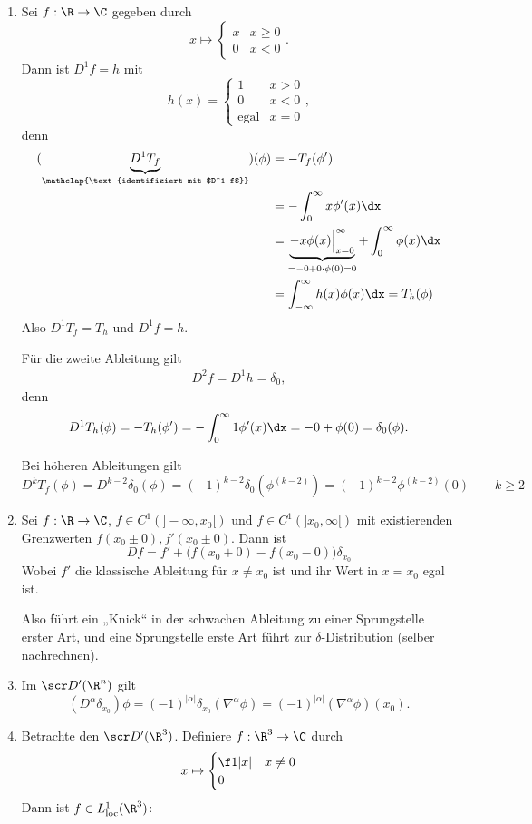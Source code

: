 \begin{ex} \label{5.15}
	\begin{enumerate}[1)]
		\item
			Sei $f : \R \to \C$ gegeben durch
			\[
				x \mapsto \begin{cases}
					x & x \ge 0 \\
					0 & x < 0
				\end{cases}.
			\]			
			Dann ist $D^1 f = h $ mit
			\[
				h(x) = \begin{cases}
					1 & x > 0 \\
					0 & x < 0 \\
					\text{egal} & x = 0
				\end{cases},
			\]
			denn
			\begin{align*}
				(\underbrace{D^1 T_f}_{\mathclap{\text{identifiziert mit $D^1 f$}}})(\phi) 
				&= - T_f (\phi') \\
				&= - \int_0^\infty x \phi'(x) \dx \\
				&= \underbrace{- x \phi(x) \Big|_{x=0}^\infty}_{= -0 + 0 \cdot \phi(0) = 0} + \int_{0}^\infty \phi(x) \dx \\
				&= \int_{-\infty}^\infty  h(x) \phi(x) \dx
				= T_h(\phi)
			\end{align*}
			Also $D^1 T_f = T_h$ und $D^1 f = h$.

			Für die zweite Ableitung gilt
			\begin{align*}
				D^2 f = D^1 h = \delta_0,
			\end{align*}
			denn
			\begin{align*}
				D^1 T_h(\phi)
				= - T_h(\phi')
				= - \int_0^\infty 1 \phi'(x) \dx
				= - 0 + \phi(0)
				= \delta_0(\phi).
			\end{align*}

			Bei höheren Ableitungen gilt
			\[
				D^k T_f(\phi)
				= D^{k-2} \delta_0(\phi)
				= (-1)^{k-2} \delta_0(\phi^{(k-2)})
				= (-1)^{k-2} \phi^{(k-2)}(0) \qquad k \ge 2
			\]
		\item
			Sei $f : \R \to \C$, $f \in C^1(]-\infty, x_0[)$ und $f \in C^1(]x_0,\infty[)$ mit existierenden Grenzwerten $f(x_0\pm 0), f'(x_0 \pm 0)$.
			Dann ist
			\[
				Df = f' + \big(f(x_0+0) - f(x_0-0)\big) \delta_{x_0}
			\]
			Wobei $f'$ die klassische Ableitung für $x \neq x_0$ ist und ihr Wert in $x = x_0$ egal ist.

			Also führt ein „Knick“ in der schwachen Ableitung zu einer Sprungstelle erster Art, und eine Sprungstelle erste Art führt zur $\delta$-Distribution (selber nachrechnen).
		\item
			Im $\scr D'(\R^n)$ gilt
			\[
				(D^\alpha \delta_{x_0}) \phi
				= (-1)^{|\alpha|} \delta_{x_0} (\nabla^\alpha \phi)
				= (-1)^{|\alpha|} (\nabla^\alpha \phi) (x_0).
			\]
		\item
			Betrachte den $\scr D'(\R^3)$.
			Definiere $f : \R^3 \to \C$ durch
			\[
				x \mapsto \begin{cases}
					\f 1{|x|} & x \neq 0 \\
					0
				\end{cases}
			\]
			Dann ist $f \in L_\text{loc}^1(\R^3)$:


\end{enumerate}
\end{ex}
